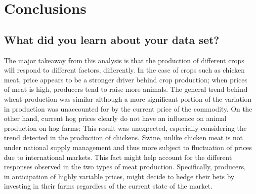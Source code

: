 \section{Conclusions}

\subsection{What did you learn about your data set?}

The major takeaway from this analysis is that the production of different crops will respond to different factors, differently.
In the case of crops such as chicken meat, price appears to be a stronger driver behind crop production; when prices of meat is high, producers tend to raise more animals.
The general trend behind wheat production was similar although a more significant portion of the variation in production was unaccounted for by the current price of the commodity.
On the other hand, current hog prices clearly do not have an influence on animal production on hog farms;
This result was unexpected, especially considering the trend detected in the production of chickens.
Swine, unlike chicken meat is not under national supply management and thus more subject to fluctuation of prices due to international markets.
This fact might help account for the different responses observed in the two types of meat production.
Specifically, producers, in anticipation of highly variable prices, might decide to hedge their bets by investing in their farms regardless of the current state of the market.